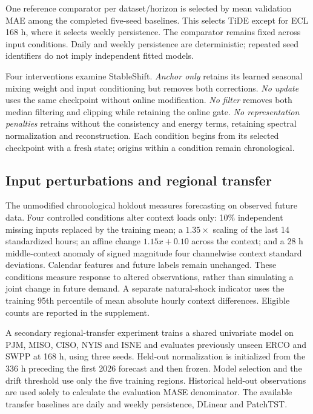 \documentclass[final,5p,times]{elsarticle}
\begin{document}
One reference comparator per dataset/horizon is selected by mean validation MAE among the completed five-seed baselines. This selects TiDE except for ECL 168 h, where it selects weekly persistence. The comparator remains fixed across input conditions. Daily and weekly persistence are deterministic; repeated seed identifiers do not imply independent fitted models.

Four interventions examine StableShift. \emph{Anchor only} retains its learned seasonal mixing weight and input conditioning but removes both corrections. \emph{No update} uses the same checkpoint without online modification. \emph{No filter} removes both median filtering and clipping while retaining the online gate. \emph{No representation penalties} retrains without the consistency and energy terms, retaining spectral normalization and reconstruction. Each condition begins from its selected checkpoint with a fresh state; origins within a condition remain chronological.

\subsection{Input perturbations and regional transfer}
The unmodified chronological holdout measures forecasting on observed future data. Four controlled conditions alter context loads only: 10\% independent missing inputs replaced by the training mean; a $1.35\times$ scaling of the last 14 standardized hours; an affine change $1.15x+0.10$ across the context; and a 28 h middle-context anomaly of signed magnitude four channelwise context standard deviations. Calendar features and future labels remain unchanged. These conditions measure response to altered observations, rather than simulating a joint change in future demand. A separate natural-shock indicator uses the training 95th percentile of mean absolute hourly context differences. Eligible counts are reported in the supplement.

A secondary regional-transfer experiment trains a shared univariate model on PJM, MISO, CISO, NYIS and ISNE and evaluates previously unseen ERCO and SWPP at 168 h, using three seeds. Held-out normalization is initialized from the 336 h preceding the first 2026 forecast and then frozen. Model selection and the drift threshold use only the five training regions. Historical held-out observations are used solely to calculate the evaluation MASE denominator. The available transfer baselines are daily and weekly persistence, DLinear and PatchTST.
\end{document}
